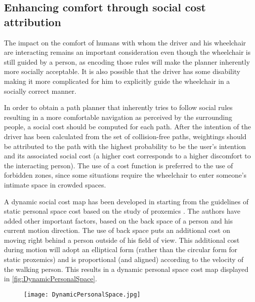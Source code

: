 \subsection{Enhancing comfort through social cost attribution} \label{sec:Comfort}
The impact on the comfort of humans with whom the driver and his wheelchair are interacting remains an important consideration even though the wheelchair is still guided by a person, as encoding those rules will make the planner inherently more socially acceptable. It is also possible that the driver has some disability making it more complicated for him to explicitly guide the wheelchair in a socially correct manner.

In order to obtain a path planner that inherently tries to follow social rules resulting in a more comfortable navigation as perceived by the surrounding people, a social cost should be computed for each path. After the intention of the driver has been calculated from the set of collision-free paths, weightings should be attributed to the path with the highest probability to be the user's intention and its associated social cost (a higher cost corresponds to a higher discomfort to the interacting person). The use of a cost function is preferred to the use of forbidden zones, since some situations require the wheelchair to enter someone’s intimate space in crowded spaces. 

A dynamic social cost map has been developed in \cite{ScandoloFraichard2011} starting from the guidelines of static personal space cost based on the study of proxemics \cite{Hall1966}. The authors have added other important factors, based on the back space of a person and his current motion direction. The use of back space puts an additional cost on moving right behind a person outside of his field of view. This additional cost during motion will adopt an elliptical form (rather than the circular form for static proxemics) and is proportional (and aligned) according to the velocity of the walking person.  This results in a dynamic personal space cost map displayed in \cref{fig:DynamicPersonalSpace}.

\begin{figure}[!htbp]
	\centering
    \texttt{[image: DynamicPersonalSpace.jpg]}
\end{figure}
 \vspace{-0.5em}
